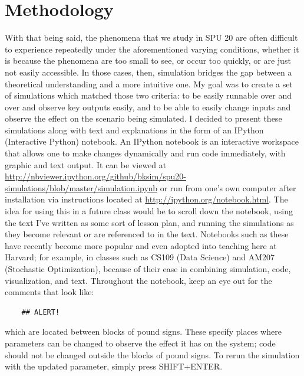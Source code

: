 \documentclass[12pt]{article}
\begin{document}
\section{Methodology}
With that being said, the phenomena that we study in SPU 20 are often difficult to experience repeatedly under the aforementioned varying conditions, whether it is because the phenomena are too small to see, or occur too quickly, or are just not easily accessible. In those cases, then, simulation bridges the gap between a theoretical understanding and a more intuitive one. My goal was to create a set of simulations which matched those two criteria: to be easily runnable over and over and observe key outputs easily, and to be able to easily change inputs and observe the effect on the scenario being simulated. I decided to present these simulations along with text and explanations in the form of an IPython (Interactive Python) notebook. An IPython notebook is an interactive workspace that allows one to make changes dynamically and run code immediately, with graphic and text output. It can be viewed at \url{http://nbviewer.ipython.org/github/bksim/spu20-simulations/blob/master/simulation.ipynb} or run from one's own computer after installation via instructions located at \url{http://ipython.org/notebook.html}. The idea for using this in a future class would be to scroll down the notebook, using the text I've written as some sort of lesson plan, and running the simulations as they become relevant or are referenced to in the text. Notebooks such as these have recently become more popular and even adopted into teaching here at Harvard; for example, in classes such as CS109 (Data Science) and AM207 (Stochastic Optimization), because of their ease in combining simulation, code, visualization, and text. Throughout the notebook, keep an eye out for the comments that look like:

\begin{verbatim}
    ## ALERT! 
\end{verbatim}
which are located between blocks of pound signs. These specify places where parameters can be changed to observe the effect it has on the system; code should not be changed outside the blocks of pound signs. To rerun the simulation with the updated parameter, simply press SHIFT+ENTER.
\end{document}
